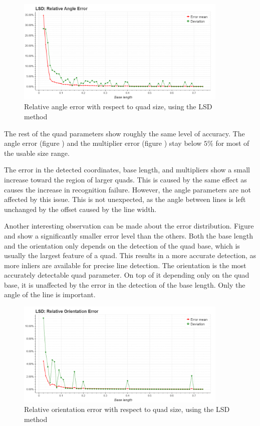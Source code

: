 \begin{figure}[ht]
	\centering
	\includegraphics[width=0.9\textwidth]{figures/plots/lsd_relative_angle_error.png}
	\caption{Relative angle error with respect to quad size, using the LSD method}
	\label{fig:lsdRelAngleErr}
\end{figure}
The rest of the quad parameters show roughly the same level of accuracy.
The angle error (figure ) and the multiplier error (figure ) stay below $5\%$ for most of the usable size range.

The error in the detected coordinates, base length, and multipliers show a small increase toward the region of larger quads.
This is caused by the same effect as causes the increase in recognition failure.
However, the angle parameters are not affected by this issue.
This is not unexpected, as the angle between lines is left unchanged by the offset caused by the line width. 

Another interesting observation can be made about the error distribution.
Figure  and  show a significantly smaller error level than the others.
Both the base length and the orientation only depends on the detection of the quad base, which is usually the largest feature of a quad.
This results in a more accurate detection, as more inliers are available for precise line detection.
The orientation is the most accurately detectable quad parameter. 
On top of it depending only on the quad base, it is unaffected by the error in the detection of the base length.
Only the angle of the line is important.
\begin{figure}[ht]
	\centering
	\includegraphics[width=0.9\textwidth]{figures/plots/lsd_relative_orientation_error.png}
	\caption{Relative orientation error with respect to quad size, using the LSD method}
	\label{fig:lsdRelOrientErr}
\end{figure}

